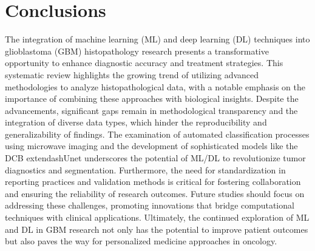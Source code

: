 \documentclass[runningheads]{llncs}
\begin{document}
\section{Conclusions}
The integration of machine learning (ML) and deep learning (DL) techniques into glioblastoma (GBM) histopathology research presents a transformative opportunity to enhance diagnostic accuracy and treatment strategies. This systematic review highlights the growing trend of utilizing advanced methodologies to analyze histopathological data, with a notable emphasis on the importance of combining these approaches with biological insights. Despite the advancements, significant gaps remain in methodological transparency and the integration of diverse data types, which hinder the reproducibility and generalizability of findings. The examination of automated classification processes using microwave imaging and the development of sophisticated models like the DCB	extendash{}Unet underscores the potential of ML/DL to revolutionize tumor diagnostics and segmentation. Furthermore, the need for standardization in reporting practices and validation methods is critical for fostering collaboration and ensuring the reliability of research outcomes. Future studies should focus on addressing these challenges, promoting innovations that bridge computational techniques with clinical applications. Ultimately, the continued exploration of ML and DL in GBM research not only has the potential to improve patient outcomes but also paves the way for personalized medicine approaches in oncology.
\end{document}
